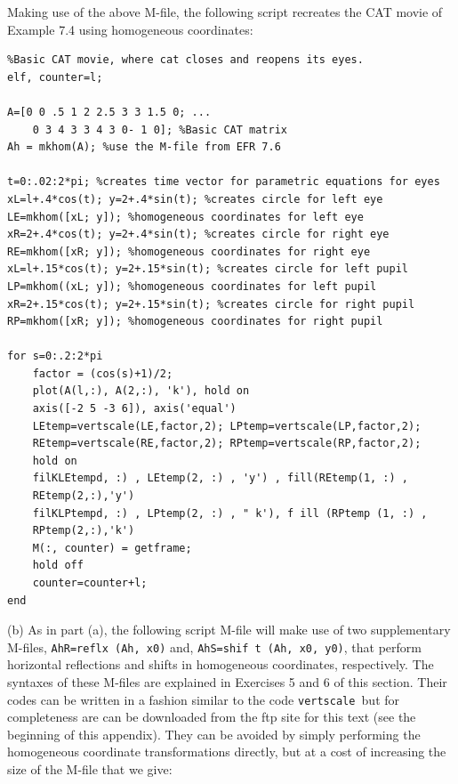\documentclass[../main.tex]{subfiles}
\begin{document}
Making use of the above M-file, the following script recreates the CAT movie of Example 7.4 using 
homogeneous coordinates:
\begin{lstlisting}[numbers=none]
%script for EFR 7.6(a): catmovieNol.m cat movie creation 
%Basic CAT movie, where cat closes and reopens its eyes. 
elf, counter=l; 

A=[0 0 .5 1 2 2.5 3 3 1.5 0; ... 
	0 3 4 3 3 4 3 0- 1 0]; %Basic CAT matrix 
Ah = mkhom(A); %use the M-file from EFR 7.6 

t=0:.02:2*pi; %creates time vector for parametric equations for eyes 
xL=l+.4*cos(t); y=2+.4*sin(t); %creates circle for left eye 
LE=mkhom([xL; y]); %homogeneous coordinates for left eye 
xR=2+.4*cos(t); y=2+.4*sin(t); %creates circle for right eye 
RE=mkhom([xR; y]); %homogeneous coordinates for right eye 
xL=l+.15*cos(t); y=2+.15*sin(t); %creates circle for left pupil 
LP=mkhom((xL; y]); %homogeneous coordinates for left pupil 
xR=2+.15*cos(t); y=2+.15*sin(t); %creates circle for right pupil 
RP=mkhom([xR; y]); %homogeneous coordinates for right pupil
 
for s=0:.2:2*pi 
	factor = (cos(s)+1)/2; 
	plot(A(l,:), A(2,:), 'k'), hold on 
	axis([-2 5 -3 6]), axis('equal') 
	LEtemp=vertscale(LE,factor,2); LPtemp=vertscale(LP,factor,2); 
	REtemp=vertscale(RE,factor,2); RPtemp=vertscale(RP,factor,2); 
	hold on 
	filKLEtempd, :) , LEtemp(2, :) , 'y') , fill(REtemp(1, :) , 
	REtemp(2,:),'y') 
	filKLPtempd, :) , LPtemp(2, :) , " k'), f ill (RPtemp (1, :) , 
	RPtemp(2,:),'k') 
	M(:, counter) = getframe; 
	hold off 
	counter=counter+l; 
end
\end{lstlisting} 
(b) As in part (a), the following script M-file will make use of two supplementary M-files, 
\texttt{AhR=reflx (Ah, x0)} and, \texttt{AhS=shif t (Ah, x0, y0)}, that perform horizontal reflections and 
shifts in homogeneous coordinates, respectively. The syntaxes of these M-files are explained in 
Exercises 5 and 6 of this section. Their codes can be written in a fashion similar to the code 
\texttt{vertscale }but for completeness are can be downloaded from the ftp site for this text (see the 
beginning of this appendix). They can be avoided by simply performing the homogeneous coordinate 
transformations directly, but at a cost of increasing the size of the M-file that we give: 
\end{document}
